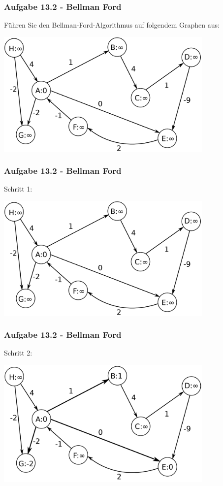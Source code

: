 \documentclass{beamer}
\begin{document}
\begin{frame}
	\frametitle{Aufgabe 13.2 - Bellman Ford}
	Führen Sie den Bellman-Ford-Algorithmus auf folgendem Graphen aus:
	\begin{center}
		\includegraphics[width=0.8\textwidth]{images/bellman_ford.png}
	\end{center}
\end{frame}

\begin{frame}
	\frametitle{Aufgabe 13.2 - Bellman Ford}
	Schritt 1:
	\begin{center}
		\includegraphics[width=0.8\textwidth]{images/bellman_ford.png}
	\end{center}
\end{frame}

\begin{frame}
	\frametitle{Aufgabe 13.2 - Bellman Ford}
	Schritt 2:
	\begin{center}
		\includegraphics[width=0.8\textwidth]{images/bellman_ford1.png}
	\end{center}
\end{frame}
\end{document}
